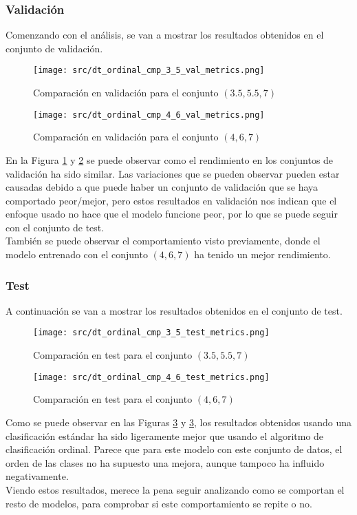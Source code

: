 \subsubsection*{Validación}
Comenzando con el análisis, se van a mostrar los resultados obtenidos en el conjunto de validación.
\begin{figure}[H]
	\centering
	\texttt{[image: src/dt\_ordinal\_cmp\_3\_5\_val\_metrics.png]}
	\caption{Comparación en validación para el conjunto  $(3.5,5.5,7)$ }
	\label{fig:dt_ordin_val_cmp_1}
\end{figure}
\begin{figure}[H]
	\centering
	\texttt{[image: src/dt\_ordinal\_cmp\_4\_6\_val\_metrics.png]}
	\caption{Comparación en validación para el conjunto $(4,6,7)$}
	\label{fig:dt_ordin_val_cmp_2}
\end{figure}
En la Figura \ref{fig:dt_ordin_val_cmp_1} y \ref{fig:dt_ordin_val_cmp_2} se puede observar como el rendimiento en los conjuntos de validación ha sido similar. Las variaciones que se pueden observar pueden estar causadas debido a que puede haber un conjunto de validación que se haya comportado peor/mejor, pero estos resultados en validación nos indican que el enfoque usado no hace que el modelo funcione peor, por lo que se puede seguir con el conjunto de test.\\
También se puede observar el comportamiento visto previamente, donde el modelo entrenado con el conjunto $(4,6,7)$ ha tenido un mejor rendimiento.
\subsubsection*{Test}
A continuación se van a mostrar los resultados obtenidos en el conjunto de test.
\begin{figure}[H]
	\centering
	\texttt{[image: src/dt\_ordinal\_cmp\_3\_5\_test\_metrics.png]}
	\caption{Comparación en test para el conjunto  $(3.5,5.5,7)$}
	\label{fig:dt_ordin_test_cmp_1}
\end{figure}
\begin{figure}[H]
	\centering
	\texttt{[image: src/dt\_ordinal\_cmp\_4\_6\_test\_metrics.png]}
	\caption{Comparación en test para el conjunto  $(4,6,7)$}
	\label{fig:dt_ordin_test_cmp_2}
\end{figure}
Como se puede observar en las Figuras \ref{fig:dt_ordin_test_cmp_1} y \ref{fig:dt_ordin_test_cmp_1}, los resultados obtenidos usando una clasificación estándar ha sido ligeramente mejor que usando el algoritmo de clasificación ordinal. Parece que para este modelo con este conjunto de datos, el orden de las clases no ha supuesto una mejora, aunque tampoco ha influido negativamente.\\
\linebreak
Viendo estos resultados, merece la pena seguir analizando como se comportan el resto de modelos, para comprobar si este comportamiento se repite o no.
\clearpage
